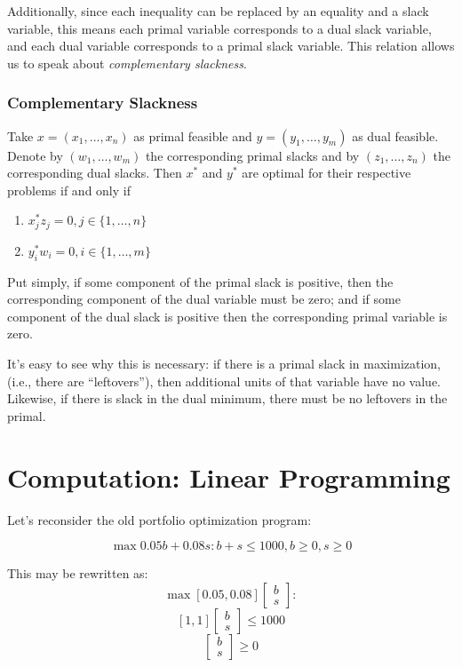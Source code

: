 \documentclass[11pt,]{article}
\providecommand{\tightlist}{%
  \setlength{\itemsep}{0pt}\setlength{\parskip}{0pt}}
\begin{document}
Additionally, since each inequality can be replaced by an equality and a
slack variable, this means each primal variable corresponds to a dual
slack variable, and each dual variable corresponds to a primal slack
variable. This relation allows us to speak about \emph{complementary
slackness}.

\subsubsection{Complementary Slackness}\label{complementary-slackness}

Take \(x = (x_1,\hdots, x_n)\) as primal feasible and
\(y = (y_1,\hdots, y_m)\) as dual feasible. Denote by
\((w_1,\hdots,w_m)\) the corresponding primal slacks and by
\((z_1,\hdots,z_n)\) the corresponding dual slacks. Then \(x^*\) and
\(y^*\) are optimal for their respective problems if and only if

\begin{enumerate}
\def\labelenumi{\arabic{enumi}.}
\tightlist
\item
  \(x^*_jz_j = 0, j \in \{1,\hdots,n\}\)
\item
  \(y^*_iw_i = 0, i \in \{1,\hdots,m\}\)
\end{enumerate}

Put simply, if some component of the primal slack is positive, then the
corresponding component of the dual variable must be zero; and if some
component of the dual slack is positive then the corresponding primal
variable is zero.

It's easy to see why this is necessary: if there is a primal slack in
maximization, (i.e., there are ``leftovers''), then additional units of
that variable have no value. Likewise, if there is slack in the dual
minimum, there must be no leftovers in the primal.

\section{Computation: Linear
Programming}\label{computation-linear-programming}

Let's reconsider the old portfolio optimization program:

\[\max 0.05b+0.08s: b+s\leq 1000, b \geq 0, s \geq 0\]

This may be rewritten as:
\[\max{} [0.05, 0.08]\begin{bmatrix}b\\s\end{bmatrix}:\]
\[[1,1]\begin{bmatrix}b\\s\end{bmatrix}\leq 1000\]
\[\begin{bmatrix}b\\s\end{bmatrix}\geq 0\]
\end{document}
